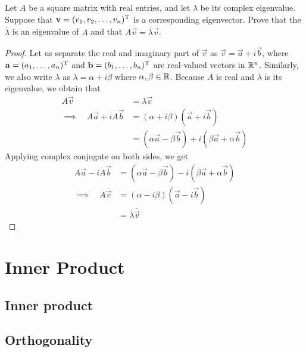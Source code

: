 \documentclass{article}
\begin{document}
\begin{exercise}
  Let $A$ be a square matrix with real entries, and let $\lambda$
  be its complex eigenvalue. Suppose that $\mathbf{v}=(v_1,v_2,\dots,v_n)^\mathrm{T}$
  is a corresponding eigenvector. Prove that the $\overline{\lambda}$ is an
  eigenvalue of $A$ and that 
  $A\overline{\vec{v}}=\overline{\lambda}\overline{\vec{v}}$.
\end{exercise}
\begin{proof}
  Let us separate the real and imaginary part of $\vec{v}$ as
  $\vec{v}=\vec{a}+i\vec{b}$, where 
  $\mathbf{a}=(a_1,\dots,a_n)^\mathrm{T}$ and $\mathbf{b}=(b_1,\dots,b_n)^\mathrm{T}$
  are real-valued vectors in $\R^n$. Similarly, we also write $\lambda$ as
  $\lambda=\alpha+i\beta$ where $\alpha,\beta\in\R$.
  Because $A$ is real and $\lambda$
  is its eigenvalue, we obtain that
  \begin{align*}
    A\vec{v}
      &=\lambda\vec{v}\\\implies\quad
    A\vec{a}+iA\vec{b}
      &=(\alpha+i\beta)(\vec{a}+i\vec{b})\\
      &=(\alpha\vec{a}-\beta\vec{b})+i(\beta\vec{a}+\alpha\vec{b})
  \end{align*}
  Applying complex conjugate on both sides, we get
  \begin{align*}
    A\vec{a}-iA\vec{b}
    &=(\alpha\vec{a}-\beta\vec{b})-i(\beta\vec{a}+\alpha\vec{b})\\
    \implies\quad A\overline{\vec{v}}
    &=(\alpha-i\beta)(\vec{a}-i\vec{b})\\
    &=\overline{\lambda}\overline{\vec{v}}
  \end{align*}
\end{proof}
\chapter{Inner Product}

\section{Inner product}
\section{Orthogonality}
\end{document}
